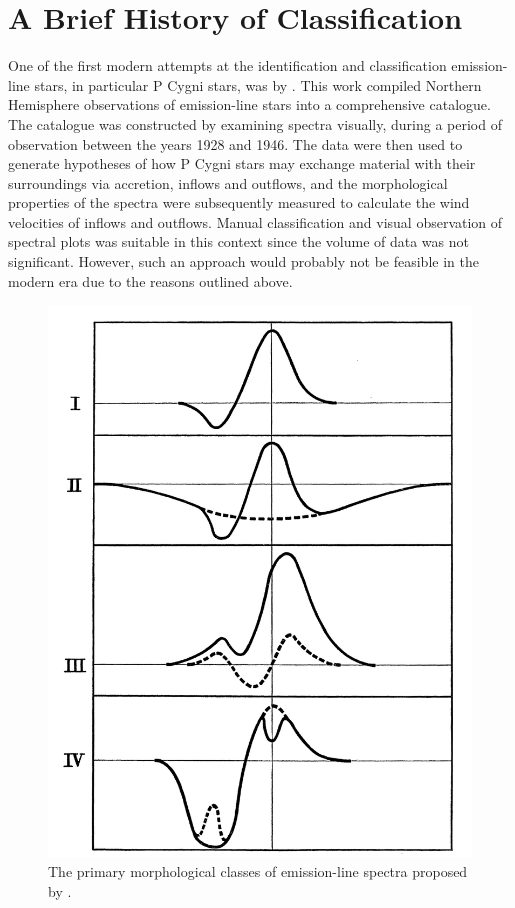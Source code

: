 \section{A Brief History of Classification}
One of the first modern attempts at the identification and classification emission-line stars, in particular P Cygni stars, was by \citet{1953PDAO....9....1B}. This work compiled Northern Hemisphere observations of emission-line stars into a comprehensive catalogue. The catalogue was constructed by examining spectra visually, during a period of observation between the years 1928 and 1946. The data were then used to generate hypotheses of how P Cygni stars may exchange material with their surroundings via accretion, inflows and outflows, and the morphological properties of the spectra were subsequently measured to calculate the wind velocities of inflows and outflows. Manual classification and visual observation of spectral plots was suitable in this context since the volume of data was not significant. However, such an approach would probably not be feasible in the modern era due to the reasons outlined above.

\begin{figure}[!htb]
\centering
\includegraphics[scale=.35]{figures/beals class 1.png}
\caption{The primary morphological classes of emission-line spectra proposed by \citet{1953PDAO....9....1B}.}
\end{figure}

